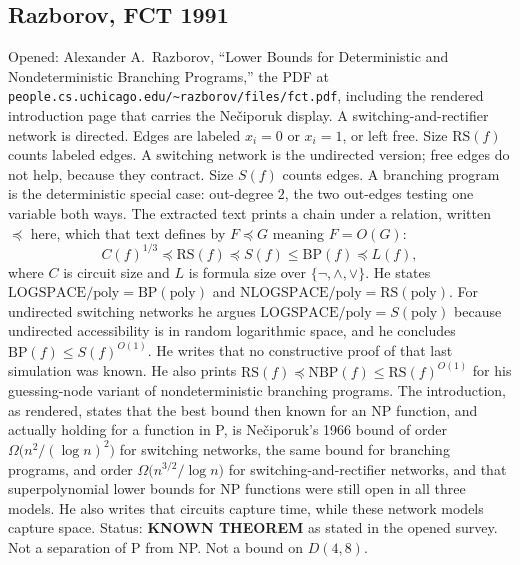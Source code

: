 \documentclass[11pt]{article}
\begin{document}
\subsection*{Razborov, FCT 1991}
Opened: Alexander A.\ Razborov, ``Lower Bounds for Deterministic and Nondeterministic Branching Programs,'' the PDF at \texttt{people.cs.uchicago.edu/\textasciitilde razborov/files/fct.pdf}, including the rendered introduction page that carries the Ne\v{c}iporuk display.
A switching-and-rectifier network is directed.
Edges are labeled \(x_i=0\) or \(x_i=1\), or left free.
Size \(\mathrm{RS}(f)\) counts labeled edges.
A switching network is the undirected version; free edges do not help, because they contract.
Size \(S(f)\) counts edges.
A branching program is the deterministic special case: out-degree \(2\), the two out-edges testing one variable both ways.
The extracted text prints a chain under a relation, written \(\preceq\) here, which that text defines by \(F\preceq G\) meaning \(F=O(G)\):
\[
C(f)^{1/3}\preceq\mathrm{RS}(f)\preceq S(f)\le\mathrm{BP}(f)\preceq L(f),
\]
where \(C\) is circuit size and \(L\) is formula size over \(\{\neg,\wedge,\vee\}\).
He states \(\mathrm{LOGSPACE}/\mathrm{poly}=\mathrm{BP}(\mathrm{poly})\) and \(\mathrm{NLOGSPACE}/\mathrm{poly}=\mathrm{RS}(\mathrm{poly})\).
For undirected switching networks he argues \(\mathrm{LOGSPACE}/\mathrm{poly}=S(\mathrm{poly})\) because undirected accessibility is in random logarithmic space, and he concludes \(\mathrm{BP}(f)\le S(f)^{O(1)}\).
He writes that no constructive proof of that last simulation was known.
He also prints \(\mathrm{RS}(f)\preceq\mathrm{NBP}(f)\le\mathrm{RS}(f)^{O(1)}\) for his guessing-node variant of nondeterministic branching programs.
The introduction, as rendered, states that the best bound then known for an NP function, and actually holding for a function in P, is Ne\v{c}iporuk's 1966 bound of order \(\Omega\bigl(n^2/(\log n)^2\bigr)\) for switching networks, the same bound for branching programs, and order \(\Omega\bigl(n^{3/2}/\log n\bigr)\) for switching-and-rectifier networks, and that superpolynomial lower bounds for NP functions were still open in all three models.
He also writes that circuits capture time, while these network models capture space.
Status: \textbf{KNOWN THEOREM} as stated in the opened survey.
Not a separation of P from NP.
Not a bound on \(D(4,8)\).
\end{document}
